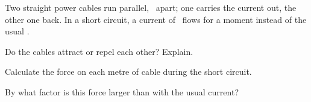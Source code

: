 Two straight power cables run parallel, \dO\ apart; one carries the current out, the other one back. In a short circuit, a current of \IO\ flows for a moment instead of the usual \IoO.

\begin{abcliste}
\abc Do the cables attract or repel each other? Explain.

\abc Calculate the force on each metre of cable during the short circuit.

\abc By what factor is this force larger than with the usual current?
\end{abcliste}

